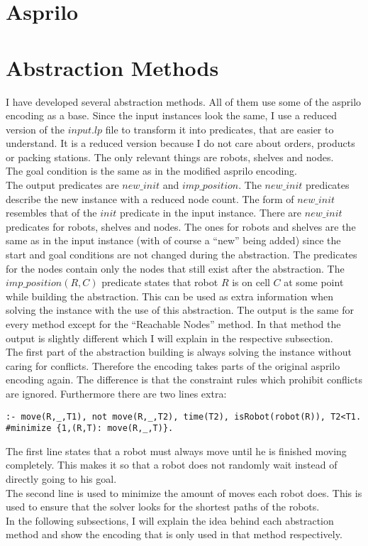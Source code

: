 \documentclass[runningheads]{llncs}
\begin{document}
\section{Asprilo}

\section{Abstraction Methods}
I have developed several abstraction methods. All of them use some of the asprilo encoding as a base. Since the input instances look the same, I use a reduced version of the $input.lp$ file to transform it into predicates, that are easier to understand.
It is a reduced version because I do not care about orders, products or packing stations. The only relevant things are robots, shelves and nodes. \\
The goal condition is the same as in the modified asprilo encoding. \\
The output predicates are $new\_init$ and $imp\_position$. The $new\_init$ predicates describe the new instance with a reduced node count. The form of $new\_init$ resembles that of the $init$ predicate in the input instance. There are $new\_init$ predicates for robots, shelves and nodes. The ones
for robots and shelves are the same as in the input instance (with of course a ``new'' being added) since the start and goal conditions are not changed during the abstraction. The predicates for the nodes contain only the nodes that still exist after the abstraction. The $imp\_position(R,C)$ predicate states that robot $R$ is on cell $C$ at some point while building the abstraction. This can be used as extra information when solving the instance with the use of this abstraction. The output is the same for every method except for the ``Reachable Nodes'' method. In that method the output is slightly different which I will explain in the respective subsection. \\
The first part of the abstraction building is always solving the instance without caring for conflicts. Therefore the encoding takes parts of the original asprilo encoding again. The difference is that the constraint rules which prohibit conflicts are ignored.
Furthermore there are two lines extra:
\begin{verbatim}
:- move(R,_,T1), not move(R,_,T2), time(T2), isRobot(robot(R)), T2<T1.
#minimize {1,(R,T): move(R,_,T)}.
\end{verbatim}
The first line states that a robot must always move until he is finished moving completely. This makes it so that a robot does not randomly wait instead of directly going to his goal. \\
The second line is used to minimize the amount of moves each robot does. This is used to ensure that the solver looks for the shortest paths of the robots. \\
In the following subsections, I will explain the idea behind each abstraction method and show the encoding that is only used in that method respectively. 
\end{document}
